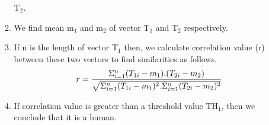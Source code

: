 \begin{enumerate}
\begin{enumerate}
T$_2$.
\item We find mean m$_1$ and m$_2$ of vector T$_1$ and T$_2$ respectively.
\item If n is the length of vector T$_1$ then, we calculate correlation
value (r) between these two vectors to find similarities as follows.
	\begin{equation}
	r = {{\Sigma ^n _{i = 1}(T_{1i} - m_1) . (T_{2i} - m_2)}
\over {\sqrt {\Sigma ^n _{i = 1} (T_{1i} - m_1)^2 . \Sigma ^n _{i = 1} (T_{2i}
- m_2)^2}}}
	\end{equation}
\item If correlation value is greater than a threshold value TH$_1$,
then we conclude that it is a human.
\end{enumerate} 
\end{enumerate} 
